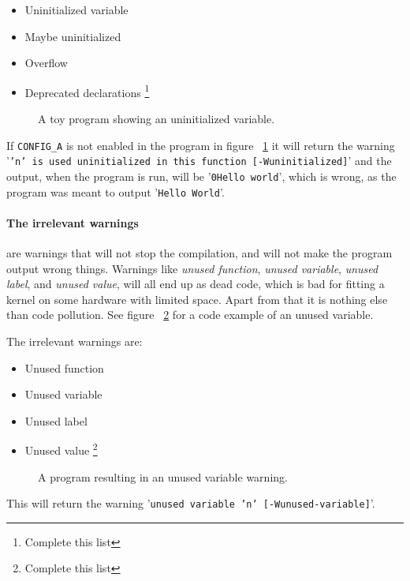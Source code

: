 \documentclass[a4paper,11pt]{report}
\newcommand{\textcode}[1]{
    \fboxsep=1pt
    \texttt{\colorbox{gray!20}{#1}}
}
\newcommand{\figa}{
    \begin{figure}[!htpb]
    \centering
}
\newcommand{\figb}[2]{
    \caption{#1}
    \label{#2}
    \end{figure}
}
\begin{document}
\begin{itemize}
    \item Uninitialized variable
    \item Maybe uninitialized
    \item Overflow
    \item Deprecated declarations
        \footnote{Complete this list}
\end{itemize}

\figa
    
\figb{A toy program showing an uninitialized variable.}{lst:uninitvar}

If \textcode{CONFIG\_A} is not enabled in the program in figure 
~\ref{lst:uninitvar} it will return the warning 
'\texttt{'n' is used uninitialized in this function [-Wuninitialized]}' and the 
output, when the program is run, will be '\texttt{0Hello world}',
which is wrong, as the program was meant to output '\texttt{Hello World}'.

    \paragraph{The irrelevant warnings}
are warnings that will not stop the compilation, and will not make the program 
output wrong things. Warnings like \emph{unused function}, \emph{unused 
variable}, \emph{unused label}, and \emph{unused value}, will all end up as 
dead code, which is bad for fitting a kernel on some hardware with limited 
space. Apart from that it is nothing else than code pollution. See figure 
~\ref{lst:unusedvar} for a code example  of an unused variable.

The irrelevant warnings are:

\begin{itemize}
    \item Unused function
    \item Unused variable
    \item Unused label
    \item Unused value
        \footnote{Complete this list}
\end{itemize}

\figa
    
\figb{A program resulting in an unused variable warning.}{lst:unusedvar}

This will return the warning '\texttt{unused variable 'n' [-Wunused-variable]}'.

\fi %
\end{document}
